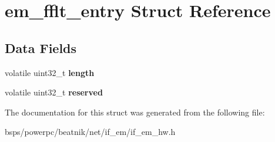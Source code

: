\hypertarget{structem__fflt__entry}{}\section{em\+\_\+fflt\+\_\+entry Struct Reference}
\label{structem__fflt__entry}
\subsection*{Data Fields}
\begin{DoxyCompactItemize}
\item 
\mbox{\label{structem__fflt__entry_ab925a3de7ad869501f646a788ba7a8f9}} 
volatile uint32\+\_\+t {\bfseries length}
\item 
\mbox{\label{structem__fflt__entry_a532d7d2011a05b847a9cc0e9c2fb6d68}} 
volatile uint32\+\_\+t {\bfseries reserved}
\end{DoxyCompactItemize}


The documentation for this struct was generated from the following file\+:\begin{DoxyCompactItemize}
\item 
bsps/powerpc/beatnik/net/if\+\_\+em/if\+\_\+em\+\_\+hw.\+h\end{DoxyCompactItemize}
